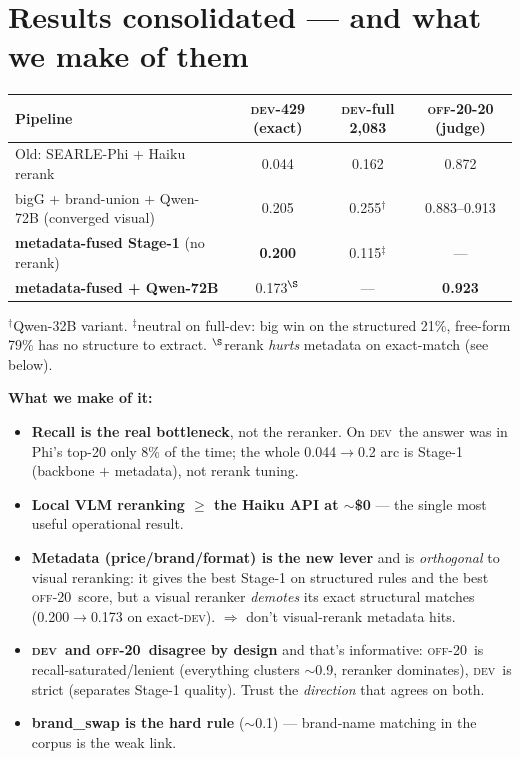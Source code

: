 \documentclass[10pt]{article}
\newcommand{\dev}{\textsc{dev}}
\newcommand{\off}{\textsc{off-20}}
\begin{document}
\section{Results consolidated --- and what we make of them}
\begin{table}[h]\centering\small
\begin{tabular}{@{}lccc@{}}
\toprule
Pipeline & \dev-429 (exact) & \dev-full 2{,}083 & \off-20 (judge) \\
\midrule
Old: SEARLE-Phi + Haiku rerank & 0.044 & 0.162 & 0.872 \\
bigG + brand-union + Qwen-72B (converged visual) & 0.205 & 0.255$^{\dagger}$ & 0.883--0.913 \\
\textbf{metadata-fused Stage-1} (no rerank) & \textbf{0.200} & 0.115$^{\ddagger}$ & --- \\
\textbf{metadata-fused + Qwen-72B} & 0.173$^{\S}$ & --- & \textbf{0.923} \\
\bottomrule
\end{tabular}
\end{table}
{\footnotesize $^{\dagger}$Qwen-32B variant. $^{\ddagger}$neutral on full-dev: big win on the structured 21\%,
free-form 79\% has no structure to extract. $^{\S}$rerank \emph{hurts} metadata on exact-match (see below).}

\textbf{What we make of it:}
\begin{itemize}
\item \textbf{Recall is the real bottleneck}, not the reranker. On \dev\ the answer was in Phi's top-20
only 8\% of the time; the whole 0.044$\to$0.2 arc is Stage-1 (backbone $+$ metadata), not rerank tuning.
\item \textbf{Local VLM reranking $\ge$ the Haiku API at $\sim$\$0} --- the single most useful operational result.
\item \textbf{Metadata (price/brand/format) is the new lever} and is \emph{orthogonal} to visual reranking:
it gives the best Stage-1 on structured rules and the best \off\ score, but a visual reranker \emph{demotes}
its exact structural matches (0.200$\to$0.173 on exact-\dev). $\Rightarrow$ don't visual-rerank metadata hits.
\item \textbf{\dev\ and \off\ disagree by design} and that's informative: \off\ is recall-saturated/lenient
(everything clusters $\sim$0.9, reranker dominates), \dev\ is strict (separates Stage-1 quality). Trust the
\emph{direction} that agrees on both.
\item \textbf{brand\_swap is the hard rule} ($\sim$0.1) --- brand-name matching in the corpus is the weak link.
\end{itemize}
\end{document}
